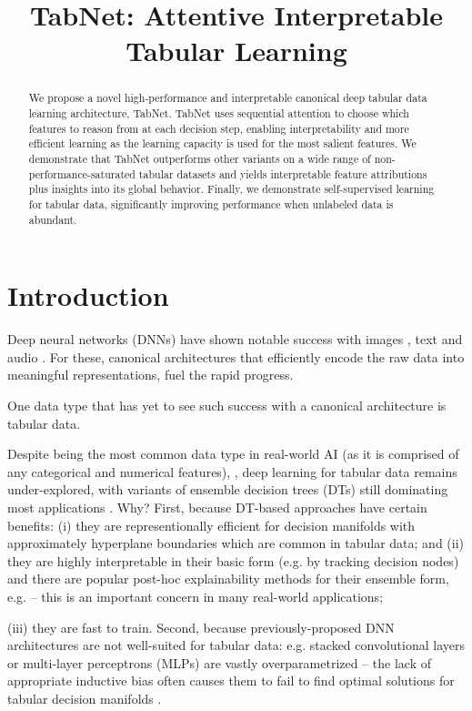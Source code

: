 \title{TabNet: Attentive Interpretable Tabular Learning}

\begin{abstract}
We propose a novel high-performance and interpretable canonical deep tabular data learning architecture, TabNet. TabNet uses sequential attention to choose which features to reason from at each decision step, enabling interpretability and more efficient learning as the learning capacity is used for the most salient features. We demonstrate that TabNet outperforms other variants on a wide range of non-performance-saturated tabular datasets and yields interpretable feature attributions plus insights into its global behavior. Finally, we demonstrate self-supervised learning for tabular data, significantly improving performance when unlabeled data is abundant.
\end{abstract}

\section{Introduction}
Deep neural networks (DNNs) have shown notable success with images \citep{resnet}, text \citep{rcnn_text} and audio \citep{deepspeech2}. For these, canonical architectures that efficiently encode the raw data into meaningful representations, fuel the rapid progress.

One data type that has yet to see such success with a canonical architecture is tabular data. 

Despite being the most common data type in real-world AI (as it is comprised of any categorical and numerical features), \citep{mckinsey_report}, deep learning for tabular data remains under-explored, with variants of ensemble decision trees (DTs) still dominating most applications \citep{kaggletrends}. Why? First, because DT-based approaches have certain benefits: (i) they are representionally efficient for decision manifolds with approximately hyperplane boundaries which are common in tabular data; and (ii) they are highly interpretable in their basic form (e.g. by tracking decision nodes) and there are popular post-hoc explainability methods for their ensemble form, e.g. \citep{shap} -- this is an important concern in many real-world applications;

(iii) they are fast to train. Second, because previously-proposed DNN architectures are not well-suited for tabular data: e.g. stacked convolutional layers or multi-layer perceptrons (MLPs) are vastly overparametrized -- the lack of appropriate inductive bias often causes them to fail to find optimal solutions for tabular decision manifolds \citep{Goodfellow2016, shavitt2018regularization, tablegan}. 

